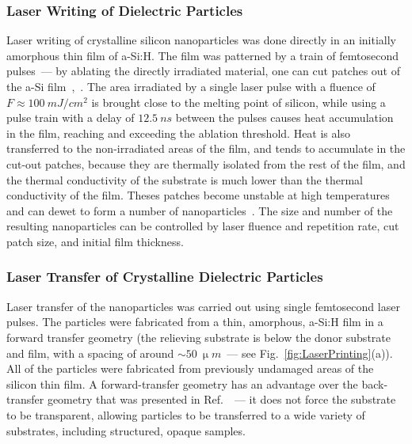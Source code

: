         \subsubsection{Laser Writing of Dielectric Particles}
        \label{met:writing}
                Laser writing of crystalline silicon nanoparticles was done directly in an initially amorphous thin film of a-Si:H.
            The film was patterned by a train of femtosecond pulses~--- by ablating the directly irradiated material, one can cut patches
            out of the a-Si film~\cite{makarov2016controllable},~. The area irradiated by a single laser pulse
            with a fluence of $F\approx100~\si{mJ/cm^{2}}$ is brought close to the melting point of silicon, while using a pulse train with
            a delay of $12.5~\si{ns}$ between the pulses causes heat accumulation in the film, reaching and exceeding the ablation threshold.
                Heat is also transferred to the non-irradiated areas of the film, and tends to accumulate in the cut-out patches, because they
            are thermally isolated from the rest of the film, and the thermal conductivity of the substrate is much lower than the thermal
            conductivity of the film. Theses patches become unstable at high temperatures and can dewet to form a number of nanoparticles~\cite{thompson2012solid}.
            The size and number of the resulting nanoparticles can be controlled by laser fluence and repetition rate, cut patch size, and
            initial film thickness.

        \subsubsection{Laser Transfer of Crystalline Dielectric Particles}
        \label{met:transfer}

                Laser transfer of the nanoparticles was carried out using single femtosecond laser pulses. The particles were fabricated from
            a thin, amorphous, a-Si:H film in a forward transfer geometry (the relieving substrate is below the donor substrate and film, with a
            spacing of around $\sim 50~\si{\upmu m}$~--- see Fig.~\ref{fig:LaserPrinting}(a)). All of the particles were fabricated from
            previously undamaged areas of the silicon thin film. A forward-transfer geometry has an advantage over the back-transfer geometry
            that was presented in Ref.~\cite{zywietz2014laser}~--- it does not force the substrate to be transparent, allowing particles to be
            transferred to a wide variety of substrates, including structured, opaque samples.

